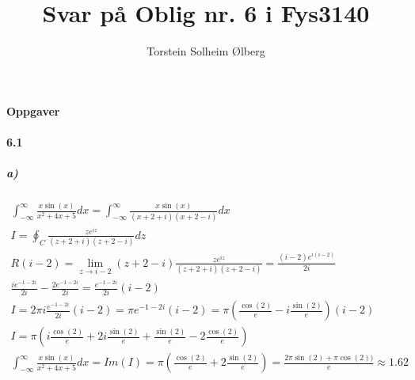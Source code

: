 \documentclass[11pt, A4paper,norsk]{article}
\author{Torstein Solheim Ølberg}
\title{Svar på Oblig nr. 6 i Fys3140}
\begin{document}
\maketitle
	\begin{center}
\Large \textbf{Oppgaver}
	\end{center}









		\paragraph{6.1}
			\subparagraph{a)}
				\begin{gather*}
\int_{- \infty}^{\infty} \frac{x \sin(x)}{x^2 + 4x + 5} dx = \int_{- \infty}^{\infty} \frac{x \sin(x)}{(x + 2 + i)(x + 2 - i)} dx \\
I = \oint_{C} \frac{z e^{i z}}{(z + 2 + i)(z + 2 - i)} dz \\
R(i - 2) = \lim_{z \rightarrow i - 2} (z + 2 - i) \frac{z e^{i z}}{(z + 2 + i)(z + 2 - i)} = \frac{(i - 2) e^{i (i - 2)}}{2i} \\
\frac{i e^{-1 - 2i}}{2i} - \frac{2 e^{-1 - 2i}}{2i} = \frac{e^{-1 - 2i}}{2i} (i - 2) \\
I = 2 \pi i \frac{e^{-1 - 2i}}{2i} (i - 2) = \pi e^{-1 - 2i} (i - 2) = \pi\left( \frac{\cos(2)}{e} - i \frac{\sin(2)}{e} \right) (i - 2) \\
I = \pi \left( i \frac{\cos(2)}{e} + 2 i \frac{\sin(2)}{e} + \frac{\sin(2)}{e} - 2 \frac{\cos(2)}{e} \right) \\
\int_{- \infty}^{\infty} \frac{x \sin(x)}{x^2 + 4x + 5} dx = Im(I) = \pi \left(  \frac{\cos(2)}{e} + 2 \frac{\sin(2)}{e} \right) = \frac{2 \pi \sin(2) + \pi \cos(2) )}{e} \approx 1.62
				\end{gather*}
\end{document}
